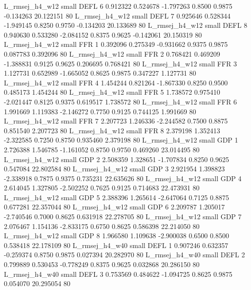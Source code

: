 L_rmsej_h4_w12      small     DEFL                 6 0.912322 0.524678 -1.797263 0.8500 0.9875 -0.134263   20.122151 80
L_rmsej_h4_w12      small     DEFL                 7 0.925646 0.528344 -1.949145 0.8250 0.9750 -0.134203   20.133689 80
L_rmsej_h4_w12      small     DEFL                 8 0.940630 0.533280 -2.084152 0.8375 0.9625 -0.142061   20.150319 80
L_rmsej_h4_w12      small      FFR                 1 0.392096 0.275349 -0.931662 0.9375 0.9875  0.087783    0.392096 80
L_rmsej_h4_w12      small      FFR                 2 0.768421 0.469209 -1.388831 0.9125 0.9625  0.206695    0.768421 80
L_rmsej_h4_w12      small      FFR                 3 1.127731 0.652989 -1.665052 0.8625 0.9875  0.347227    1.127731 80
L_rmsej_h4_w12      small      FFR                 4 1.454244 0.821264 -1.867330 0.8250 0.9500  0.485173    1.454244 80
L_rmsej_h4_w12      small      FFR                 5 1.738572 0.975410 -2.021447 0.8125 0.9375  0.619517    1.738572 80
L_rmsej_h4_w12      small      FFR                 6 1.991669 1.119383 -2.146272 0.7750 0.9125  0.744125    1.991669 80
L_rmsej_h4_w12      small      FFR                 7 2.207723 1.246336 -2.244582 0.7500 0.8875  0.851540    2.207723 80
L_rmsej_h4_w12      small      FFR                 8 2.379198 1.352413 -2.322585 0.7250 0.8750  0.935460    2.379198 80
L_rmsej_h4_w12      small      GDP                 1 2.726388 1.546785 -1.161052 0.8750 0.9750  0.469260   23.014495 80
L_rmsej_h4_w12      small      GDP                 2 2.508359 1.328651 -1.707834 0.8250 0.9625  0.547084   22.802584 80
L_rmsej_h4_w12      small      GDP                 3 2.921954 1.398823 -2.338918 0.7875 0.9375  0.735231   22.635626 80
L_rmsej_h4_w12      small      GDP                 4 2.614045 1.327805 -2.502252 0.7625 0.9125  0.714683   22.473931 80
L_rmsej_h4_w12      small      GDP                 5 2.388396 1.265614 -2.647064 0.7125 0.8875  0.677281   22.357044 80
L_rmsej_h4_w12      small      GDP                 6 2.209787 1.205017 -2.740546 0.7000 0.8625  0.631918   22.278705 80
L_rmsej_h4_w12      small      GDP                 7 2.076467 1.154136 -2.833175 0.6750 0.8625  0.586398   22.214050 80
L_rmsej_h4_w12      small      GDP                 8 1.966580 1.109638 -2.900038 0.6500 0.8500  0.538418   22.178109 80
L_rmsej_h4_w40      small     DEFL                 1 0.907246 0.632357 -0.259374 0.8750 0.9875  0.027394   20.282970 80
L_rmsej_h4_w40      small     DEFL                 2 0.799889 0.530453 -0.778249 0.8375 0.9625  0.032868   20.286150 80
L_rmsej_h4_w40      small     DEFL                 3 0.753569 0.484622 -1.094725 0.8625 0.9875  0.054070   20.295054 80
